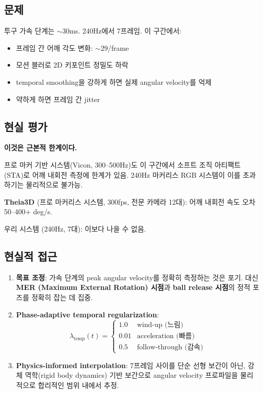 \documentclass[11pt, a4paper]{report}
\begin{document}
\subsection{문제}
투구 가속 단계는 $\sim$30ms. 240Hz에서 7프레임. 이 구간에서:
\begin{itemize}[leftmargin=*]
  \item 프레임 간 어깨 각도 변화: $\sim$29\textdegree/frame
  \item 모션 블러로 2D 키포인트 정밀도 하락
  \item temporal smoothing을 강하게 하면 실제 angular velocity를 억제
  \item 약하게 하면 프레임 간 jitter
\end{itemize}

\subsection{현실 평가}

\begin{limitbox}
\textbf{이것은 근본적 한계이다.}

프로 마커 기반 시스템(Vicon, 300--500Hz)도 이 구간에서 소프트 조직 아티팩트(STA)로 어깨 내회전 측정에 한계가 있음. 240Hz 마커리스 RGB 시스템이 이를 초과하기는 물리적으로 불가능.

\textbf{Theia3D} (프로 마커리스 시스템, 300fps, 전문 카메라 12대): 어깨 내회전 속도 오차 50--400+ deg/s.

우리 시스템 (240Hz, 7대): 이보다 나을 수 없음.
\end{limitbox}

\subsection{현실적 접근}

\begin{enumerate}[leftmargin=*]
  \item \textbf{목표 조정}: 가속 단계의 peak angular velocity를 정확히 측정하는 것은 포기.
        대신 \textbf{MER (Maximum External Rotation) 시점}과 \textbf{ball release 시점}의 정적 포즈를 정확히 잡는 데 집중.

  \item \textbf{Phase-adaptive temporal regularization}:
  \begin{equation}
  \lambda_\text{temp}(t) = \begin{cases}
  1.0 & \text{wind-up (느림)} \\
  0.01 & \text{acceleration (빠름)} \\
  0.5 & \text{follow-through (감속)}
  \end{cases}
  \end{equation}

  \item \textbf{Physics-informed interpolation}: 7프레임 사이를 단순 선형 보간이 아닌, 강체 역학(rigid body dynamics) 기반 보간으로 angular velocity 프로파일을 물리적으로 합리적인 범위 내에서 추정.
\end{enumerate}
\end{document}
